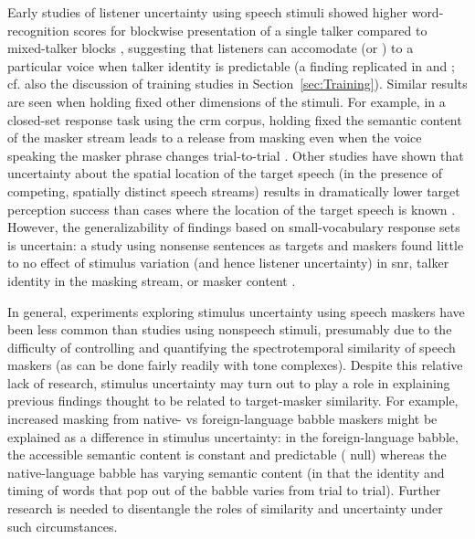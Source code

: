 Early studies of listener uncertainty using speech stimuli showed higher word-recognition scores for blockwise presentation of a single talker compared to mixed-talker blocks \citep{SommersEtAl1994}, suggesting that listeners can accomodate (or ) to a particular voice when talker identity is predictable (a finding replicated in \citealt{BrungartSimpson2004} and \citealt{EricsonEtAl2004}; cf. also the discussion of training studies in Section~\ref{sec:Training}).  Similar results are seen when holding fixed other dimensions of the stimuli.  For example, in a closed-set response task using the \ac{crm} corpus, holding fixed the semantic content of the masker stream leads to a release from masking even when the voice speaking the masker phrase changes trial-to-trial \citep{BrungartSimpson2004}.  Other studies have shown that uncertainty about the spatial location of the target speech (in the presence of competing, spatially distinct speech streams) results in dramatically lower target perception success than cases where the location of the target speech is known \citep{EricsonEtAl2004, KiddEtAl2005a}.  However, the generalizability of findings based on small-vocabulary response sets is uncertain: a study using nonsense sentences as targets and maskers found little to no effect of stimulus variation (and hence listener uncertainty) in \ac{snr}, talker identity in the masking stream, or masker content \citep{FreymanEtAl2007}.

In general, experiments exploring stimulus uncertainty using speech maskers have been less common than studies using nonspeech stimuli, presumably due to the difficulty of controlling and quantifying the spectrotemporal similarity of speech maskers (as can be done fairly readily with tone complexes).  Despite this relative lack of research, stimulus uncertainty may turn out to play a role in explaining previous findings thought to be related to target-masker similarity.  For example, increased masking from native- vs foreign-language babble maskers \citep[\eg][]{RhebergenEtAl2005, GarciaLecumberriCooke2006, VanEngenBradlow2007, BrouwerEtAl2012} might be explained as a difference in stimulus uncertainty: in the foreign-language babble, the accessible semantic content is constant and predictable (\ie{} null) whereas the native-language babble has varying semantic content (in that the identity and timing of words that pop out of the babble varies from trial to trial).  Further research is needed to disentangle the roles of similarity and uncertainty under such circumstances.  %

